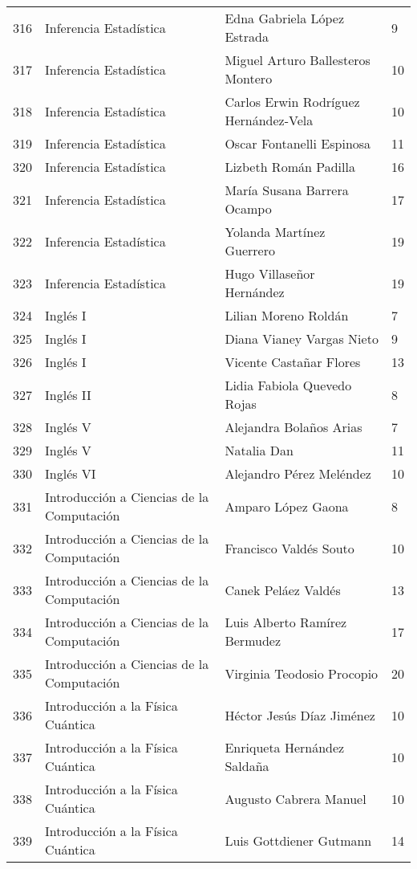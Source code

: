 \begin{table}[ht]
\begin{tabular}{rlll}
  316 & Inferencia Estadística & Edna Gabriela López Estrada & 9 \\ 
  317 & Inferencia Estadística & Miguel Arturo Ballesteros Montero & 10 \\ 
  318 & Inferencia Estadística & Carlos Erwin Rodríguez Hernández-Vela & 10 \\ 
  319 & Inferencia Estadística & Oscar Fontanelli Espinosa & 11 \\ 
  320 & Inferencia Estadística & Lizbeth Román Padilla & 16 \\ 
  321 & Inferencia Estadística & María Susana Barrera Ocampo & 17 \\ 
  322 & Inferencia Estadística & Yolanda Martínez Guerrero & 19 \\ 
  323 & Inferencia Estadística & Hugo Villaseñor Hernández & 19 \\ 
  324 & Inglés I & Lilian Moreno Roldán & 7 \\ 
  325 & Inglés I & Diana Vianey Vargas Nieto & 9 \\ 
  326 & Inglés I & Vicente Castañar Flores & 13 \\ 
  327 & Inglés II & Lidia Fabiola Quevedo Rojas & 8 \\ 
  328 & Inglés V & Alejandra Bolaños Arias & 7 \\ 
  329 & Inglés V & Natalia Dan & 11 \\ 
  330 & Inglés VI & Alejandro Pérez Meléndez & 10 \\ 
  331 & Introducción a Ciencias de la Computación & Amparo López Gaona & 8 \\ 
  332 & Introducción a Ciencias de la Computación & Francisco Valdés Souto & 10 \\ 
  333 & Introducción a Ciencias de la Computación & Canek Peláez Valdés & 13 \\ 
  334 & Introducción a Ciencias de la Computación & Luis Alberto Ramírez Bermudez & 17 \\ 
  335 & Introducción a Ciencias de la Computación & Virginia Teodosio Procopio & 20 \\ 
  336 & Introducción a la Física Cuántica & Héctor Jesús Díaz Jiménez & 10 \\ 
  337 & Introducción a la Física Cuántica & Enriqueta Hernández Saldaña & 10 \\ 
  338 & Introducción a la Física Cuántica & Augusto Cabrera Manuel & 10 \\ 
  339 & Introducción a la Física Cuántica & Luis Gottdiener Gutmann & 14 \\ 

\end{tabular}
\end{table}
